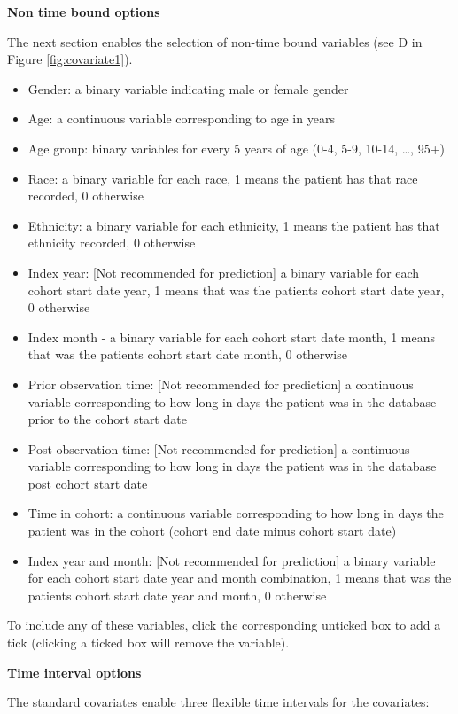 \documentclass[11pt]{book}
\providecommand{\tightlist}{%
  \setlength{\itemsep}{0pt}\setlength{\parskip}{0pt}}
\begin{document}
\textbf{Non time bound options}

The next section enables the selection of non-time bound variables (see
D in Figure \ref{fig:covariate1}).

\begin{itemize}
\tightlist
\item
  Gender: a binary variable indicating male or female gender
\item
  Age: a continuous variable corresponding to age in years
\item
  Age group: binary variables for every 5 years of age (0-4, 5-9, 10-14,
  \ldots{}, 95+)
\item
  Race: a binary variable for each race, 1 means the patient has that
  race recorded, 0 otherwise
\item
  Ethnicity: a binary variable for each ethnicity, 1 means the patient
  has that ethnicity recorded, 0 otherwise
\item
  Index year: {[}Not recommended for prediction{]} a binary variable for
  each cohort start date year, 1 means that was the patients cohort
  start date year, 0 otherwise
\item
  Index month - a binary variable for each cohort start date month, 1
  means that was the patients cohort start date month, 0 otherwise
\item
  Prior observation time: {[}Not recommended for prediction{]} a
  continuous variable corresponding to how long in days the patient was
  in the database prior to the cohort start date
\item
  Post observation time: {[}Not recommended for prediction{]} a
  continuous variable corresponding to how long in days the patient was
  in the database post cohort start date
\item
  Time in cohort: a continuous variable corresponding to how long in
  days the patient was in the cohort (cohort end date minus cohort start
  date)
\item
  Index year and month: {[}Not recommended for prediction{]} a binary
  variable for each cohort start date year and month combination, 1
  means that was the patients cohort start date year and month, 0
  otherwise
\end{itemize}

To include any of these variables, click the corresponding unticked box
to add a tick (clicking a ticked box will remove the variable).

\textbf{Time interval options}

The standard covariates enable three flexible time intervals for the
covariates:
\end{document}
